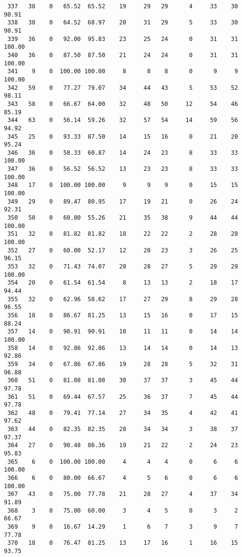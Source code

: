 \begin{verbatim}
 337   38    0   65.52  65.52    19     29   29      4     33    30    90.91
 338   38    0   64.52  68.97    20     31   29      5     33    30    90.91
 339   36    0   92.00  95.83    23     25   24      0     31    31   100.00
 340   36    0   87.50  87.50    21     24   24      0     31    31   100.00
 341    9    0  100.00 100.00     8      8    8      0      9     9   100.00
 342   59    0   77.27  79.07    34     44   43      5     53    52    98.11
 343   58    0   66.67  64.00    32     48   50     12     54    46    85.19
 344   63    0   56.14  59.26    32     57   54     14     59    56    94.92
 345   25    0   93.33  87.50    14     15   16      0     21    20    95.24
 346   36    0   58.33  60.87    14     24   23      8     33    33   100.00
 347   36    0   56.52  56.52    13     23   23      8     33    33   100.00
 348   17    0  100.00 100.00     9      9    9      0     15    15   100.00
 349   29    0   89.47  80.95    17     19   21      0     26    24    92.31
 350   50    0   60.00  55.26    21     35   38      9     44    44   100.00
 351   32    0   81.82  81.82    18     22   22      2     28    28   100.00
 352   27    0   60.00  52.17    12     20   23      3     26    25    96.15
 353   32    0   71.43  74.07    20     28   27      5     29    29   100.00
 354   20    0   61.54  61.54     8     13   13      2     18    17    94.44
 355   32    0   62.96  58.62    17     27   29      8     29    28    96.55
 356   18    0   86.67  81.25    13     15   16      0     17    15    88.24
 357   14    0   90.91  90.91    10     11   11      0     14    14   100.00
 358   14    0   92.86  92.86    13     14   14      0     14    13    92.86
 359   34    0   67.86  67.86    19     28   28      5     32    31    96.88
 360   51    0   81.08  81.08    30     37   37      3     45    44    97.78
 361   51    0   69.44  67.57    25     36   37      7     45    44    97.78
 362   48    0   79.41  77.14    27     34   35      4     42    41    97.62
 363   44    0   82.35  82.35    28     34   34      3     38    37    97.37
 364   27    0   90.48  86.36    19     21   22      2     24    23    95.83
 365    6    0  100.00 100.00     4      4    4      0      6     6   100.00
 366    6    0   80.00  66.67     4      5    6      0      6     6   100.00
 367   43    0   75.00  77.78    21     28   27      4     37    34    91.89
 368    3    0   75.00  60.00     3      4    5      0      3     2    66.67
 369    9    0   16.67  14.29     1      6    7      3      9     7    77.78
 370   18    0   76.47  81.25    13     17   16      1     16    15    93.75

\end{verbatim}
